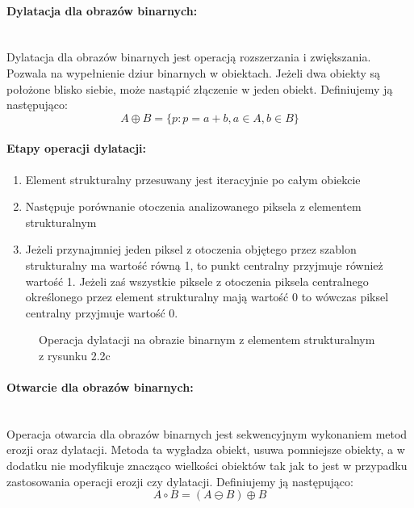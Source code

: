 \documentclass[a4paper,12pt,twoside,openany]{report}
\newcommand{\ImgPath}{.}
\begin{document}
\paragraph{Dylatacja dla obrazów binarnych:}\mbox{} \\
\indent Dylatacja dla obrazów binarnych jest operacją rozszerzania i zwiększania. Pozwala na wypełnienie dziur binarnych w obiektach. Jeżeli dwa obiekty są położone blisko siebie, może nastąpić złączenie w jeden obiekt. Definiujemy ją następująco: 
\begin{equation}
	 A \oplus B = \{p \colon p = a + b, a \in A, b \in B\} 
\end{equation}

\paragraph{Etapy operacji dylatacji:}
\begin{enumerate}
	\item Element strukturalny przesuwany jest iteracyjnie po całym obiekcie
	\item Następuje porównanie otoczenia analizowanego piksela z elementem strukturalnym
	\item Jeżeli przynajmniej jeden piksel z otoczenia objętego przez szablon strukturalny ma wartość równą 1, to punkt centralny przyjmuje również wartość 1. Jeżeli zaś wszystkie piksele z otoczenia piksela centralnego określonego przez element strukturalny mają wartość 0 to wówczas piksel centralny przyjmuje wartość 0.
\end{enumerate}

\begin{figure}[H]
	\centering
	\caption{Operacja dylatacji na obrazie binarnym z elementem strukturalnym z rysunku 2.2c}
\end{figure}

\paragraph{Otwarcie dla obrazów binarnych:}\mbox{} \\
\indent Operacja otwarcia dla obrazów binarnych jest sekwencyjnym wykonaniem metod erozji oraz dylatacji. Metoda ta wygładza obiekt, usuwa pomniejsze obiekty, a w dodatku nie modyfikuje znacząco wielkości obiektów tak jak to jest w przypadku zastosowania operacji erozji czy dylatacji. Definiujemy ją następująco:
\begin{equation}
	 A \circ B = (A \ominus B) \oplus B 
\end{equation}
\end{document}
